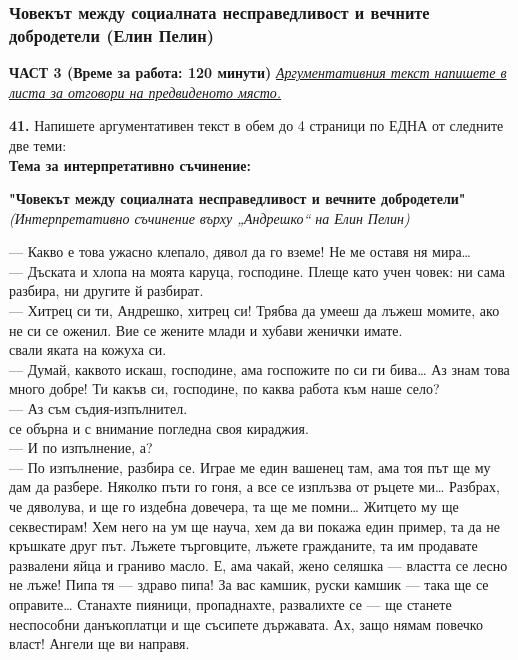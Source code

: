 \documentclass[12pt,a4paper]{article}
\begin{document}
\subsubsection{Човекът между социалната несправедливост и вечните добродетели (Елин Пелин)}
\vspace{0.5cm}
\begin{center}
\textbf{ЧАСТ 3 (Време за работа: 120 минути)}
\vspace{0.2cm}
{\textit{\underline{Аргументативния текст напишете в листа за отговори на предвиденото място.}}}
\vspace{0.1cm}
\end{center}
\textbf{41.} Напишете аргументативен текст в обем до 4 страници по ЕДНА от следните две теми:
\\
\vspace{0.2cm}
\textbf{Тема за интерпретативно съчинение:}
\vspace{0.1cm}
\begin{center}
\textbf{"Човекът между социалната несправедливост и вечните добродетели"}
\\
\textit{(Интерпретативно съчинение върху „Андрешко“ на Елин Пелин)}
\end{center}
\indent— Какво е това ужасно клепало, дявол да го вземе! Не ме оставя ня мира…
\\
— Дъската и хлопа на моята каруца, господине. Плеще като учен човек: ни сама разбира, ни другите й разбират.
\\
— Хитрец си ти, Андрешко, хитрец си! Трябва да умееш да лъжеш момите, ако не си се оженил. Вие се жените млади и хубави женички имате.
\\
 свали яката на кожуха си.
\\
— Думай, каквото искаш, господине, ама госпожите по си ги бива… Аз знам това много добре! Ти какъв си, господине, по каква работа към наше село?
\\
— Аз съм съдия-изпълнител.
\\
 се обърна и с внимание погледна своя кираджия.
\\
— И по изпълнение, а?
\\
— По изпълнение, разбира се. Играе ме един вашенец там, ама тоя път ще му дам да разбере. Няколко пъти го гоня, а все се изплъзва от ръцете ми… Разбрах, че дяволува, и ще го издебна довечера, та ще ме помни… Житцето му ще секвестирам! Хем него на ум ще науча, хем да ви покажа един пример, та да не кръшкате друг път. Лъжете търговците, лъжете гражданите, та им продавате развалени яйца и граниво масло. Е, ама чакай, жено селяшка — властта се лесно не лъже! Пипа тя — здраво пипа! За вас камшик, руски камшик — така ще се оправите… Станахте пияници, пропаднахте, развалихте се — ще станете неспособни данъкоплатци и ще съсипете държавата. Ах, защо нямам повечко власт! Ангели ще ви направя.
\end{document}
